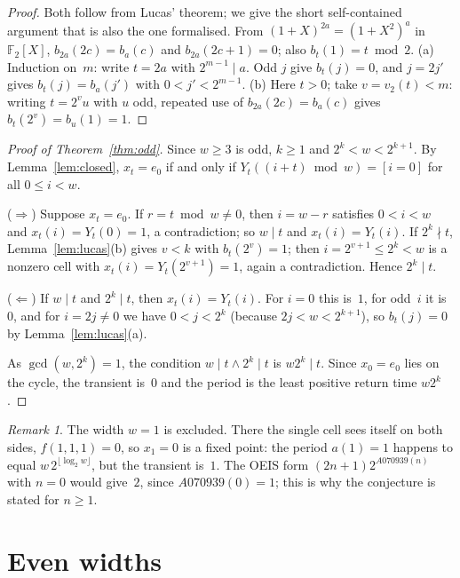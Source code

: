 \documentclass[11pt]{article}
\theoremstyle{definition}
\theoremstyle{remark}
\newtheorem{remark}[theorem]{Remark}
\newcommand{\F}{\mathbb{F}}
\begin{document}
\begin{proof}
Both follow from Lucas' theorem; we give the short self-contained argument
that is also the one formalised. From $(1+X)^{2a} = (1+X^2)^a$ in $\F_2[X]$,
$b_{2a}(2c) = b_a(c)$ and $b_{2a}(2c+1) = 0$; also $b_t(1) = t \bmod 2$.
(a) Induction on~$m$: write $t = 2a$ with $2^{m-1} \mid a$. Odd $j$ give
$b_t(j) = 0$, and $j = 2j'$ gives $b_t(j) = b_a(j')$ with $0 < j' < 2^{m-1}$.
(b) Here $t > 0$; take $v = v_2(t) < m$: writing $t = 2^{v} u$ with $u$ odd, repeated use of
$b_{2a}(2c) = b_a(c)$ gives $b_t(2^{v}) = b_u(1) = 1$.
\end{proof}

\begin{proof}[Proof of Theorem~\ref{thm:odd}]
Since $w \ge 3$ is odd, $k \ge 1$ and $2^{k} < w < 2^{k+1}$. By
Lemma~\ref{lem:closed}, $x_t = e_0$ if and only if
$Y_t((i+t) \bmod w) = [i = 0]$ for all $0 \le i < w$.

($\Rightarrow$) Suppose $x_t = e_0$. If $r = t \bmod w \ne 0$, then
$i = w - r$ satisfies $0 < i < w$ and $x_t(i) = Y_t(0) = 1$, a contradiction;
so $w \mid t$ and $x_t(i) = Y_t(i)$. If $2^{k} \nmid t$,
Lemma~\ref{lem:lucas}(b) gives $v < k$ with $b_t(2^{v}) = 1$; then
$i = 2^{v+1} \le 2^{k} < w$ is a nonzero cell with $x_t(i) = Y_t(2^{v+1}) = 1$,
again a contradiction. Hence $2^{k} \mid t$.

($\Leftarrow$) If $w \mid t$ and $2^{k} \mid t$, then $x_t(i) = Y_t(i)$.
For $i = 0$ this is~$1$, for odd~$i$ it is~$0$, and for $i = 2j \ne 0$ we have
$0 < j < 2^{k}$ (because $2j < w < 2^{k+1}$), so $b_t(j) = 0$ by
Lemma~\ref{lem:lucas}(a).

As $\gcd(w, 2^{k}) = 1$, the condition $w \mid t \wedge 2^{k} \mid t$ is
$w 2^{k} \mid t$. Since $x_0 = e_0$ lies on the cycle, the transient is~$0$
and the period is the least positive return time $w 2^{k}$.
\end{proof}

\begin{remark}
The width $w = 1$ is excluded. There the single cell sees itself on both
sides, $f(1,1,1) = 0$, so $x_1 = 0$ is a fixed point: the period $a(1) = 1$
happens to equal $w\,2^{\lfloor\log_2 w\rfloor}$, but the transient is~$1$.
The OEIS form $(2n+1)2^{A070939(n)}$ with $n = 0$ would give~$2$, since
$A070939(0) = 1$; this is why the conjecture is stated for $n \ge 1$.
\end{remark}

\section{Even widths}
\end{document}
